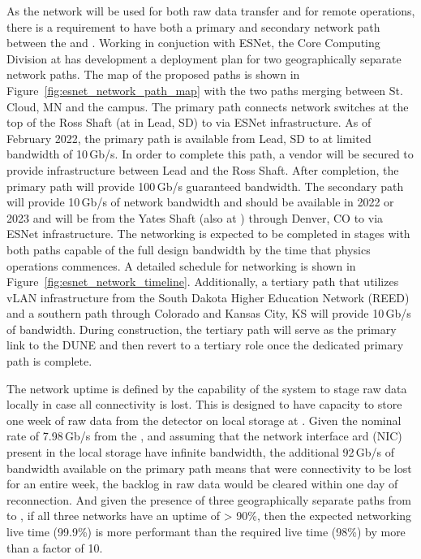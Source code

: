 \documentclass[../main-v1.tex]{subfiles}
\begin{document}
As the network will be used for both raw data transfer and for remote operations, there is a requirement to have both a primary and secondary network path between the  and . Working in conjuction with ESNet, the Core Computing Division at  has development a deployment plan for two geographically separate network paths. The map of the proposed paths is shown in Figure~\ref{fig:esnet_network_path_map} with the two paths merging between St. Cloud, MN and the  campus. The primary path connects network switches at the top of the Ross Shaft (at  in Lead, SD) to  via ESNet infrastructure. As of February 2022, the primary path is available from Lead, SD 
to  at limited bandwidth of 10\,Gb/s. In order to complete this path, a vendor will be secured to provide infrastructure between Lead and the Ross Shaft. After completion, the primary path will provide 100\,Gb/s guaranteed bandwidth. The secondary path will provide 10\,Gb/s of network bandwidth and should be available in %
2022 or 2023 and will be from the Yates Shaft (also at ) through Denver, CO to  via ESNet infrastructure. The networking is expected to be completed in stages with both paths capable of the full design bandwidth by the time that  physics operations commences. A detailed schedule for networking is shown in Figure~\ref{fig:esnet_network_timeline}. Additionally, a tertiary path that utilizes vLAN infrastructure from the South Dakota Higher Education Network (REED) and a southern path through Colorado and Kansas City, KS will provide 10\,Gb/s of bandwidth. During construction, the tertiary path will serve as the primary link to the DUNE  and then revert to a tertiary role once the dedicated primary path is complete.

The network uptime is defined by the capability of the   system to stage raw data locally in case all connectivity is lost. %
This  is designed to have capacity to store one week of raw data from the detector on local storage at . %
Given the nominal rate of 7.98\,Gb/s from the , and assuming that the network interface ard (NIC)
present in the local storage have infinite bandwidth, the additional 92\,Gb/s of bandwidth available on the primary path means that 
were connectivity to be lost for an entire week, 
the backlog in raw data would be cleared within one day of reconnection. And given the presence of three geographically separate paths from  to , if all three networks have an uptime of > 90\%, then the expected networking live time (99.9\%) is more performant than the  required live time (98\%) by more than a factor of 10.
\end{document}
